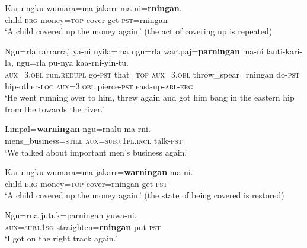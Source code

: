 \begin{exe}
	\ex \label{exAppendixGurindjiIterative1}
	\gll Karu-ngku wumara=ma jakarr ma-ni=\textbf{rningan}.\\
	child-\textsc{erg} money=\textsc{top} cover get-\textsc{pst}=rningan\\
	\glt \lq A child covered up the money again.' (the act of covering up is repeated) \parencite[6]{McConvell1983}

	\ex
	\gll Ngu=rla rarrarraj ya-ni nyila=ma ngu=rla wartpaj=\textbf{parningan} ma-ni lanti-kari-la, ngu=rla pu-nya kaa-rni-yin-tu.\\
	\textsc{aux}=3.\textsc{obl} run.\textsc{redupl} go-\textsc{pst} that=\textsc{top} \textsc{aux}=3.\textsc{obl} throw\_spear=rningan do-\textsc{pst} hip-other-\textsc{loc} \textsc{aux}=3.\textsc{obl} pierce-\textsc{pst} east-up-\textsc{abl}-\textsc{erg}\\
	\glt \lq He went running over to him, threw again and got him bang in the eastern hip from the towards the river.' \parencite[299]{MeakinsMcConvell2021}
	
	\ex \label{exAppendixGurindjiIterative3}
	\gll Limpal=\textbf{warningan} ngu=rnalu ma-rni.\\
	mens\_business=\textsc{still} \textsc{aux}=\textsc{subj}.1\textsc{pl}.\textsc{incl} talk-\textsc{pst}\\
	\glt \lq We talked about important men's business again.' \parencite[597]{MeakinsMcConvell2021}

	\ex \label{exAppendixGurindjiRestitutive1}
	\gll Karu-ngku wumara=ma jakarr=\textbf{warningan} ma-ni.\\
	child-\textsc{erg} money=\textsc{top} cover=rningan get-\textsc{pst}\\
	\glt \lq A child covered up the money again.' (the state of being covered is restored) \parencite[7]{McConvell1983}
	
	\ex \label{exAppendixGurindjiRestitutive2}
	\gll Ngu=rna jutuk=parningan yuwa-ni.\\
	\textsc{aux}=\textsc{subj}.1\textsc{sg} straighten=\textbf{rningan} put-\textsc{pst}\\
	\glt \lq I got on the right track again.' \parencite[597]{MeakinsMcConvell2021}
\end{exe}

